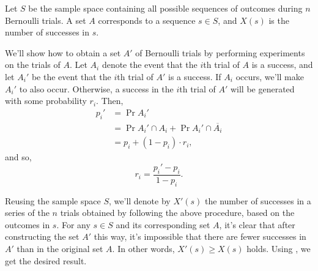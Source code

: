 Let $S$ be the sample space containing all possible sequences of outcomes during $n$ Bernoulli trials.
A set $A$ corresponds to a sequence $s\in S$, and $X(s)$ is the number of successes in $s$.

We'll show how to obtain a set $A'$ of Bernoulli trials by performing experiments on the trials of $A$.
Let $A_i$ denote the event that the $i$th trial of $A$ is a success, and let $A_i'$ be the event that the $i$th trial of $A'$ is a success.
If $A_i$ occurs, we'll make $A_i'$ to also occur.
Otherwise, a success in the $i$th trial of $A'$ will be generated with some probability $r_i$.
Then,
\begin{align*}
    p_i' &= \Pr{A_i'} \\
    &= \Pr{A_i'\cap A_i}+\Pr{A_i'\cap\overline{A_i}} \\
    &= p_i+(1-p_i)\cdot r_i,
\end{align*}
and so,
\[
    r_i = \frac{p_i'-p_i}{1-p_i}.
\]

Reusing the sample space $S$, we'll denote by $X'(s)$ the number of successes in a series of the $n$ trials obtained by following the above procedure, based on the outcomes in $s$.
For any $s\in S$ and its corresponding set $A$, it's clear that after constructing the set $A'$ this way, it's impossible that there are fewer successes in $A'$ than in the original set $A$.
In other words, $X'(s)\ge X(s)$ holds.
Using , we get the desired result.
